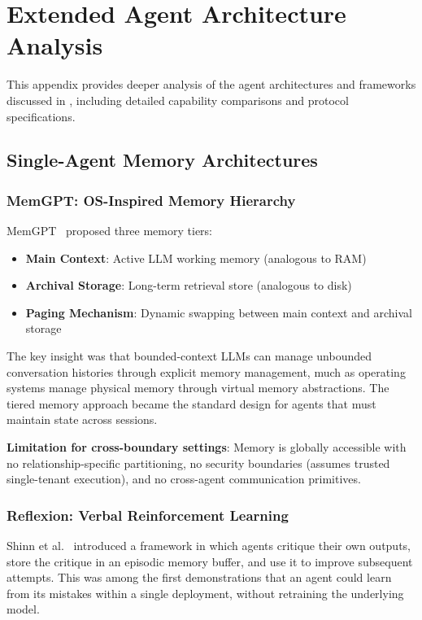\chapter{Extended Agent Architecture Analysis}
\label{appendix:extended_agents}

This appendix provides deeper analysis of the agent architectures and frameworks discussed in , including detailed capability comparisons and protocol specifications.

\section{Single-Agent Memory Architectures}

\subsection{MemGPT: OS-Inspired Memory Hierarchy}

MemGPT~\cite{packer2024memgpt} proposed three memory tiers:

\begin{itemize}
    \item \textbf{Main Context}: Active LLM working memory (analogous to RAM)
    \item \textbf{Archival Storage}: Long-term retrieval store (analogous to disk)
    \item \textbf{Paging Mechanism}: Dynamic swapping between main context and archival storage
\end{itemize}

The key insight was that bounded-context LLMs can manage unbounded conversation histories through explicit memory management, much as operating systems manage physical memory through virtual memory abstractions. The tiered memory approach became the standard design for agents that must maintain state across sessions.

\textbf{Limitation for cross-boundary settings}: Memory is globally accessible with no relationship-specific partitioning, no security boundaries (assumes trusted single-tenant execution), and no cross-agent communication primitives.

\subsection{Reflexion: Verbal Reinforcement Learning}

Shinn et al.~\cite{shinn2023reflexion} introduced a framework in which agents critique their own outputs, store the critique in an episodic memory buffer, and use it to improve subsequent attempts. This was among the first demonstrations that an agent could learn from its mistakes within a single deployment, without retraining the underlying model.


